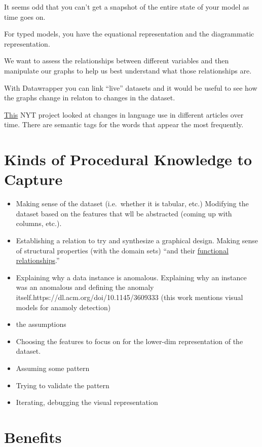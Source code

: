 \documentclass[
]{article}
\begin{document}
It seems odd that you can't get a snapshot of the entire state of your
model as time goes on.

For typed models, you have the equational representation and the
diagrammatic representation.

We want to assess the relationships between different variables and then
manipulate our graphs to help us best understand what those
relationships are.

With Datawrapper you can link ``live'' datasets and it would be useful
to see how the graphs change in relaton to changes in the dataset.

\href{https://nytlabs.com/projects/chronicle.html}{This} NYT project
looked at changes in language use in different articles over time. There
are semantic tags for the words that appear the most frequently.

\section{Kinds of Procedural Knowledge to
Capture}\label{kinds-of-procedural-knowledge-to-capture}

\begin{itemize}
\item
  Making sense of the dataset (i.e.~whether it is tabular, etc.)
  Modifying the dataset based on the features that wll be abstracted
  (coming up with columns, etc.).
\item
  Establishing a relation to try and synthesize a graphical design.
  Making sense of structural properties (with the domain sets) ``and
  their
  \href{https://dl.acm.org/doi/pdf/10.1145/22949.22950?curius=2438}{functional
  relationships}.''
\item
  Explaining why a data instance is anomalous. Explaining why an
  instance was an anomalous and defining the anomaly
  itself.https://dl.acm.org/doi/10.1145/3609333 (this work mentions
  visual models for anamoly detection)
\item
  the assumptions
\item
  Choosing the features to focus on for the lower-dim representation of
  the dataset.
\item
  Assuming some pattern
\item
  Trying to validate the pattern
\item
  Iterating, debugging the visual representation
\end{itemize}

\section{Benefits}\label{benefits}
\end{document}
